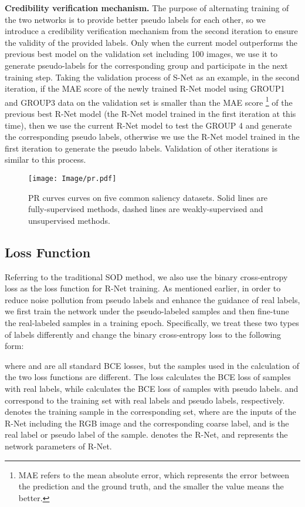 \documentclass[journal]{IEEEtran}
\begin{document}
\textbf{Credibility verification mechanism.}
The purpose of alternating training of the two networks is to provide better pseudo labels for each other, so we introduce a credibility verification mechanism from the second iteration to ensure the validity of the provided labels.
Only when the current model outperforms the previous best model on the validation set including 100 images, we use it to generate pseudo-labels for the corresponding group and participate in the next training step.
Taking the validation process of S-Net as an example, in the second iteration, if the MAE score of the newly trained R-Net model using GROUP1 and GROUP3 data on the validation set is smaller than the MAE score \footnote{MAE refers to the mean absolute error, which represents the error between the prediction and the ground truth, and the smaller the value means the better.} of the previous best R-Net model (the R-Net model trained in the first iteration at this time), then we use the current R-Net model to test the GROUP 4 and generate the corresponding pseudo labels, otherwise we use the R-Net model trained in the first iteration to generate the pseudo labels.
Validation of other iterations is similar to this process.





 \begin{figure*}[!t]
	\centering
	\texttt{[image: Image/pr.pdf]}
	\caption{PR curves curves  on five common saliency datasets. Solid lines are fully-supervised methods, dashed lines are weakly-supervised and unsupervised  methods.}
	\label{pr_fm}
\end{figure*}

\subsection{Loss Function}


Referring to the traditional SOD method, we also use the binary cross-entropy loss as the loss function for R-Net training.
As mentioned earlier, in order to reduce noise pollution from pseudo labels and enhance the guidance of real labels, we first train the network under the pseudo-labeled samples and then fine-tune the real-labeled samples in a training epoch.
Specifically, we treat these two types of labels differently and change the binary cross-entropy loss to the following form:


where  and  are all standard BCE losses, but the samples used in the calculation of the two loss functions are different. The loss  calculates the BCE loss of samples with real labels, while  calculates the BCE loss of samples with pseudo labels.
  and  correspond to the training set with real labels and pseudo labels, respectively.  denotes the training sample in the corresponding set, where  are the inputs of the R-Net including the RGB image and the corresponding coarse label, and  is the real label or pseudo label of the sample.
 denotes the R-Net, and  represents the network parameters of R-Net.
\end{document}
